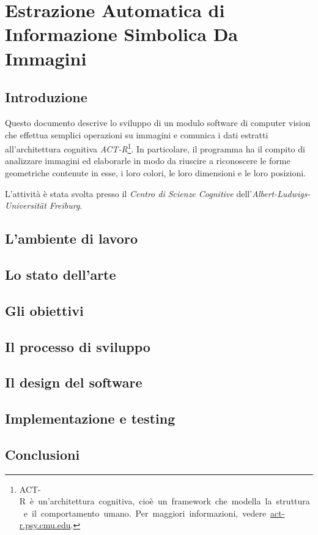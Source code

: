 \chapter*{Estrazione Automatica di Informazione Simbolica Da Immagini}
	
	\section*{Introduzione}
	Questo documento descrive lo sviluppo di un modulo software di computer vision che effettua semplici operazioni su immagini e comunica i dati estratti all'architettura cognitiva \mbox{\emph{ACT-R}\footnote{ACT-R è un'architettura cognitiva, cioè un framework che modella la struttura e il comportamento umano. Per maggiori informazioni, vedere~\url{act-r.psy.cmu.edu}.}}.
	In particolare, il programma ha il compito di analizzare immagini ed elaborarle in modo da riuscire a riconoscere le forme geometriche contenute in esse, i loro colori,  le loro dimensioni e le loro posizioni.

	L'attività è stata svolta presso il \emph{Centro di Scienze Cognitive} dell'\emph{Albert-Ludwigs-Universität Freiburg}.
	 
			
	\section*{L'ambiente di lavoro}


	\section*{Lo stato dell'arte}


	\section*{Gli obiettivi}


	\section*{Il processo di sviluppo}


	\section*{Il design del software}


	\section*{Implementazione e testing}
	

	\section*{Conclusioni}

